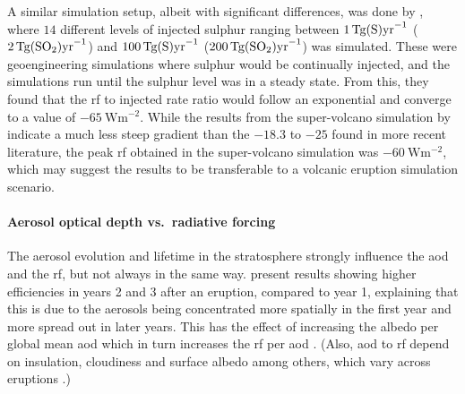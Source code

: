 \documentclass{ametsocV5}
\begin{document}
A similar simulation setup, albeit with significant differences, was done by
\citet{niemeier2015}, where \(14\) different levels of injected sulphur ranging between
\(\SI{1}{\tera\gram(\ce{S})\mathrm{yr}^{-1}}\)
(\(\SI{2}{\tera\gram(\ce{SO2})\mathrm{yr}^{-1}}\)) and
\(\SI{100}{\tera\gram(\ce{S})\mathrm{yr}^{-1}}\)
(\(\SI{200}{\tera\gram(\ce{SO2})\mathrm{yr}^{-1}}\)) was simulated. These were
geoengineering simulations where sulphur would be continually injected, and the
simulations run until the sulphur level was in a steady state. From this, they found
that the \ac{rf} to injected rate ratio would follow an exponential and converge to a
value of \(\SI{-65}{\watt\metre^{-2}}\). While the results from the super-volcano
simulation by \citet{jones2005} indicate a much less steep gradient than the \(-18.3\)
to \(-25\) found in more recent literature, the peak \ac{rf} obtained in the
super-volcano simulation was \(\SI{-60}{\watt\metre^{-2}}\), which may suggest the
\citet{niemeier2015} results to be transferable to a volcanic eruption simulation
scenario.

\paragraph*{Aerosol optical depth vs.\ radiative forcing}

The aerosol evolution and lifetime in the stratosphere strongly influence the \ac{aod}
and the \ac{rf}, but not always in the same way. \citet{marshall2020} present results
showing higher efficiencies in years 2 and 3 after an eruption, compared to year 1,
explaining that this is due to the aerosols being concentrated more spatially in the
first year and more spread out in later years. This has the effect of increasing the
albedo per global mean \ac{aod} which in turn increases the \ac{rf} per \ac{aod}
\citep{marshall2020}. (Also, \ac{aod} to \ac{rf} depend on insulation, cloudiness and
surface albedo among others, which vary across eruptions
\citep{marshall2021,andersson2015}.)

\end{document}
